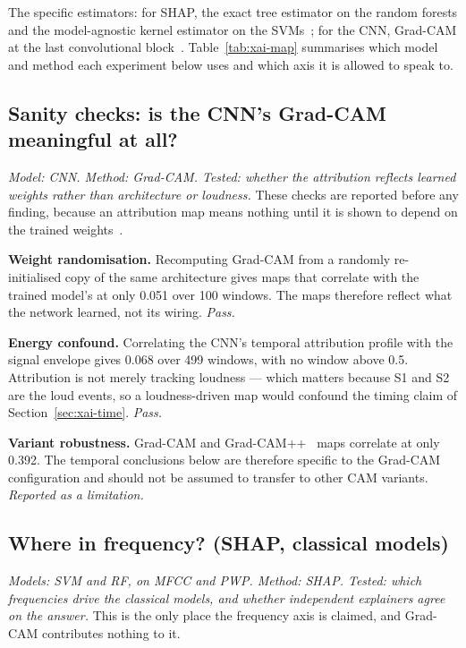 The specific estimators: for SHAP, the exact tree estimator on the random
forests and the model-agnostic kernel estimator on the
SVMs~\cite{lundberg2017unified,lundberg2020local}; for the CNN, Grad-CAM at the
last convolutional block~\cite{selvaraju2017grad}. Table~\ref{tab:xai-map}
summarises which model and method each experiment below uses and which axis it
is allowed to speak to.

\subsection{Sanity checks: is the CNN's Grad-CAM meaningful at all?}

\emph{Model: CNN. Method: Grad-CAM. Tested: whether the attribution reflects
learned weights rather than architecture or loudness.} These checks are reported
before any finding, because an attribution map means nothing until it is shown
to depend on the trained weights~\cite{adebayo2018sanity}.

\textbf{Weight randomisation.} Recomputing Grad-CAM from a randomly
re-initialised copy of the same architecture gives maps that correlate with the
trained model's at only \num{0.051} over 100 windows. The maps therefore reflect
what the network learned, not its wiring. \emph{Pass.}

\textbf{Energy confound.} Correlating the CNN's temporal attribution profile
with the signal envelope gives \num{0.068} over 499 windows, with no window
above \num{0.5}. Attribution is not merely tracking loudness --- which matters
because S1 and S2 are the loud events, so a loudness-driven map would confound
the timing claim of Section~\ref{sec:xai-time}. \emph{Pass.}

\textbf{Variant robustness.} Grad-CAM and Grad-CAM++~\cite{chattopadhay2018grad}
maps correlate at only \num{0.392}. The temporal conclusions below are therefore
specific to the Grad-CAM configuration and should not be assumed to transfer to
other CAM variants. \emph{Reported as a limitation.}

\subsection{Where in frequency? (SHAP, classical models)}
\label{sec:xai-freq}

\emph{Models: SVM and RF, on MFCC and PWP. Method: SHAP. Tested: which
frequencies drive the classical models, and whether independent explainers
agree on the answer.} This is the only place the frequency axis is claimed, and
Grad-CAM contributes nothing to it.

